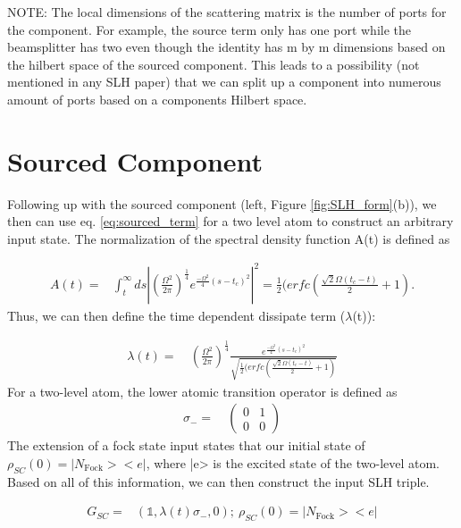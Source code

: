 \documentclass[a4paper]{article}
\theoremstyle{definition}
\begin{document}
NOTE: The local dimensions of the scattering matrix is the number of ports for the component. For example, the source term only has one port while the beamsplitter has two even though the identity has m by m dimensions based on the hilbert space of the sourced component. This leads to a possibility (not mentioned in any SLH paper) that we can split up a component into numerous amount of ports based on a components Hilbert space.

\section*{Sourced Component}
Following up with the sourced component (left, Figure \ref{fig:SLH_form}(b)), we then can use eq. \ref{eq:sourced_term} for a two level atom to construct an arbitrary input state. The normalization of the spectral density function A(t) is defined as 

\begin{align*}
    A(t) = & \int_{t}^{\infty} ds |(\frac{\Omega^2}{2\pi})^{\frac{1}{4}}e^{\frac{-\Omega^2}{4}(s-t_c)^2}|^2  = \frac{1}{2}(erfc(\frac{\sqrt{2}\Omega(t_c-t)}{2}+1).
\end{align*}
Thus, we can then define the time dependent dissipate term ($\lambda$(t)):

\begin{align*}
    \lambda(t) = & \ (\frac{\Omega^2}{2\pi})^{\frac{1}{4}}\frac{e^{\frac{-\Omega^2}{4}(s-t_c)^2}}{ \sqrt{\frac{1}{2}(erfc(\frac{\sqrt{2}\Omega(t_c-t)}{2}+1)}}
\end{align*}
For a two-level atom, the lower atomic transition operator is defined as
\begin{align*}
    \sigma_- =& \ \begin{pmatrix} 0 & 1 \\ 0 & 0 \end{pmatrix}
\end{align*}
The extension of a fock state input states that our initial state of $\rho_{SC}(0) = |N_{\text{Fock}}><e|$, where |e> is the excited state of the two-level atom. Based on all of this information, we can then construct the input SLH triple. 

\begin{align}
    G_{SC} = & ( \mathbb{1}, \lambda(t)\sigma_-, 0) ; \ \rho_{SC}(0) = |N_{\text{Fock}}><e|
    \label{eq:EX_source}
\end{align}
\end{document}
